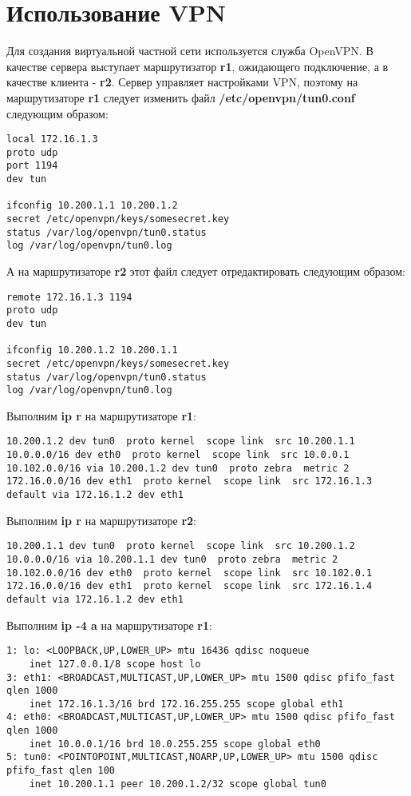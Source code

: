 \documentclass[a4paper,12pt]{article}
\begin{document}
\section{Использование VPN}

Для создания виртуальной частной сети используется служба OpenVPN.
В качестве сервера выступает маршрутизатор \textbf{r1}, ожидающего подключение, а в качестве клиента - \textbf{r2}. Сервер управляет
настройками VPN, поэтому на маршрутизаторе \textbf{r1} следует
изменить файл \textbf{/etc/openvpn/tun0.conf} следующим образом:
\begin{Verbatim}
local 172.16.1.3
proto udp
port 1194
dev tun

ifconfig 10.200.1.1 10.200.1.2
secret /etc/openvpn/keys/somesecret.key
status /var/log/openvpn/tun0.status
log /var/log/openvpn/tun0.log
\end{Verbatim}

А на маршрутизаторе \textbf{r2} этот файл следует отредактировать
следующим образом:
\begin{Verbatim}
remote 172.16.1.3 1194 
proto udp
dev tun

ifconfig 10.200.1.2 10.200.1.1
secret /etc/openvpn/keys/somesecret.key
status /var/log/openvpn/tun0.status
log /var/log/openvpn/tun0.log
\end{Verbatim}

Выполним \textbf{ip r} на маршрутизаторе \textbf{r1}:
\begin{Verbatim}
10.200.1.2 dev tun0  proto kernel  scope link  src 10.200.1.1 
10.0.0.0/16 dev eth0  proto kernel  scope link  src 10.0.0.1 
10.102.0.0/16 via 10.200.1.2 dev tun0  proto zebra  metric 2 
172.16.0.0/16 dev eth1  proto kernel  scope link  src 172.16.1.3 
default via 172.16.1.2 dev eth1 
\end{Verbatim}

Выполним \textbf{ip r} на маршрутизаторе \textbf{r2}:
\begin{Verbatim}
10.200.1.1 dev tun0  proto kernel  scope link  src 10.200.1.2 
10.0.0.0/16 via 10.200.1.1 dev tun0  proto zebra  metric 2 
10.102.0.0/16 dev eth0  proto kernel  scope link  src 10.102.0.1 
172.16.0.0/16 dev eth1  proto kernel  scope link  src 172.16.1.4 
default via 172.16.1.2 dev eth1
\end{Verbatim}

Выполним \textbf{ip -4 a} на маршрутизаторе \textbf{r1}:
\begin{Verbatim}
1: lo: <LOOPBACK,UP,LOWER_UP> mtu 16436 qdisc noqueue 
    inet 127.0.0.1/8 scope host lo
3: eth1: <BROADCAST,MULTICAST,UP,LOWER_UP> mtu 1500 qdisc pfifo_fast qlen 1000
    inet 172.16.1.3/16 brd 172.16.255.255 scope global eth1
4: eth0: <BROADCAST,MULTICAST,UP,LOWER_UP> mtu 1500 qdisc pfifo_fast qlen 1000
    inet 10.0.0.1/16 brd 10.0.255.255 scope global eth0
5: tun0: <POINTOPOINT,MULTICAST,NOARP,UP,LOWER_UP> mtu 1500 qdisc pfifo_fast qlen 100
    inet 10.200.1.1 peer 10.200.1.2/32 scope global tun0
\end{Verbatim}
\end{document}
